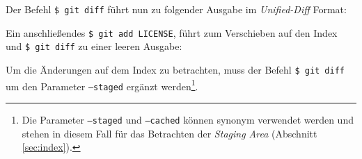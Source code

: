 
Der Befehl \texttt{\$ git diff} führt nun zu folgender Ausgabe im \textit{Unified-Diff}
Format:


Ein anschließendes \texttt{\$ git add LICENSE}, führt zum Verschieben auf den
Index und \texttt{\$ git diff} zu einer leeren Ausgabe:


Um die Änderungen auf dem Index zu betrachten, muss der Befehl \texttt{\$ git
diff} um den Parameter \texttt{--staged} ergänzt werden\footnote{Die Parameter
\texttt{--staged} und \texttt{--cached} können synonym verwendet
werden und stehen in diesem Fall für das Betrachten der \textit{Staging
Area} (Abschnitt \ref{sec:index}).}. \cite[26-29]{progit}
